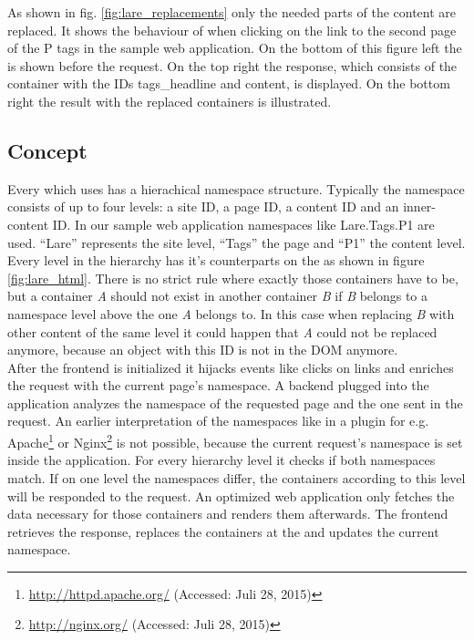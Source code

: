 \noindent{}As shown in fig. \ref{fig:lare_replacements} only the needed parts of the content are replaced.
It shows the behaviour of \lare{} when clicking on the link to the second page of the P tags in the sample web application.
On the bottom of this figure left the \webPage{} is shown before the request.
On the top right the response, which consists of the container with the IDs tags\_headline and content, is displayed.
On the bottom right the result with the replaced containers is illustrated.

\subsection{Concept\label{sec:lare_concept}}

Every \singlePageApplication{} which uses \lare{} has a hierachical namespace structure.
Typically the namespace consists of up to four levels: a site ID, a page ID, a content ID and an inner-content ID.
In our sample web application namespaces like Lare.Tags.P1 are used.
\enquote{Lare} represents the site level, \enquote{Tags} the page and \enquote{P1} the content level.
Every level in the hierarchy has it's counterparts on the \webSite{} as shown in figure \ref{fig:lare_html}.
There is no strict rule where exactly those containers have to be, but a container \emph{A} should not exist in another container \emph{B} if \emph{B} belongs to a namespace level above the one \emph{A} belongs to.
In this case when replacing \emph{B} with other content of the same level it could happen that \emph{A} could not be replaced anymore, because an object with this ID is not in the DOM anymore.
\\
After the \lare{} frontend is initialized it hijacks events like clicks on links and enriches the request with the current page's namespace.
A \lare{} backend plugged into the application analyzes the namespace of the requested page and the one sent in the request.
An earlier interpretation of the \lare{} namespaces like in a \webServer{} plugin for e.g. Apache\footnote{\url{http://httpd.apache.org/} (Accessed: Juli 28, 2015)} or Nginx\footnote{\url{http://nginx.org/} (Accessed: Juli 28, 2015)} is not possible, because the current request's namespace is set inside the application.
For every hierarchy level it checks if both namespaces match.
If on one level the namespaces differ, the containers according to this level will be responded to the request.
An optimized web application only fetches the data necessary for those containers and renders them afterwards.
The \lare{} frontend retrieves the response, replaces the containers at the \webSite{} and updates the current namespace.

